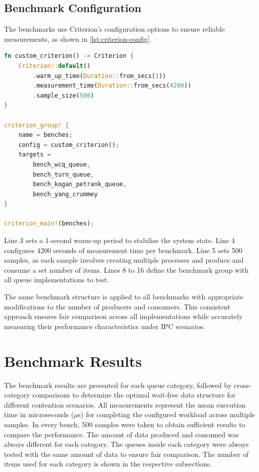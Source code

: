 \subsection{Benchmark Configuration}
The benchmarks use Criterion's configuration options to ensure reliable measurements, as shown in \cref{lst:criterion-config}.

\begin{lstlisting}[language=Rust, style=boxed, caption={Criterion benchmark configuration}, label={lst:criterion-config}]
fn custom_criterion() -> Criterion {
    Criterion::default()
        .warm_up_time(Duration::from_secs(1))
        .measurement_time(Duration::from_secs(4200))
        .sample_size(500)
}

criterion_group! {
    name = benches;
    config = custom_criterion();
    targets =
        bench_wcq_queue,
        bench_turn_queue,
        bench_kogan_petrank_queue,
        bench_yang_crummey
}

criterion_main!(benches);
\end{lstlisting}

Line 3 sets a 1-second warm-up period to stabilise the system state. Line 4 configures 4200 seconds of measurement time per benchmark. Line 5 sets 500 samples, as each sample involves creating multiple processes and produce and consume a set number of items. Lines 8 to 16 define the benchmark group with all queue implementations to test.

The same benchmark structure is applied to all benchmarks with appropriate modifications to the number of producers and consumers. This consistent approach ensures fair comparison across all implementations while accurately measuring their performance characteristics under \ac{IPC} scenarios.

\section{Benchmark Results}
The benchmark results are presented for each queue category, followed by cross-category comparisons to determine the optimal wait-free data structure for different contention scenarios. All measurements represent the mean execution time in microseconds ($\mu$s) for completing the configured workload across multiple samples. In every bench, 500 samples were taken to obtain sufficient results to compare the performance. The amount of data produced and consumed was always different for each category. The queues inside each category were always tested with the same amount of data to ensure fair comparison. The number of items used for each category is shown in the respective subsections.

